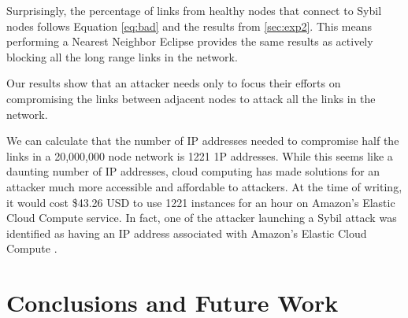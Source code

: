 \documentclass[11pt,conference]{IEEEtran}
\begin{document}
Surprisingly, the percentage of links from healthy nodes that connect to Sybil nodes follows Equation \ref{eq:bad} and the results from \ref{sec:exp2}.
This means performing a Nearest Neighbor Eclipse provides the same results as actively blocking all the long range links in the network.

Our results show that an attacker needs only to focus their efforts on compromising the links between adjacent nodes to attack all the links in the network.


We can calculate that the number of IP addresses needed to compromise half the links in a 20,000,000 node network is 1221 1P addresses.
While this seems like a daunting number of IP addresses, cloud computing has made solutions for an attacker much more accessible and affordable to attackers.
At the time of writing, it would cost \$43.26 USD to use 1221 instances for an hour on Amazon's Elastic Cloud Compute service.
In fact, one of the attacker launching a Sybil attack was identified as having an IP address associated with Amazon's Elastic Cloud Compute \cite{sybilbit}.








\section{Conclusions and Future Work}
\label{sec:horror}
\end{document}
